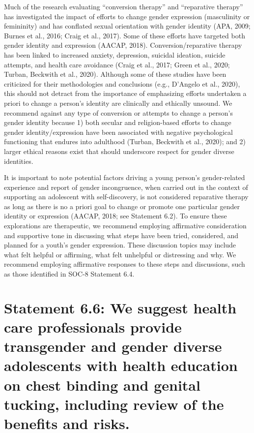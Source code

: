 \documentclass[
]{book}
\begin{document}
Much of the research evaluating ``conversion
therapy'' and ``reparative therapy'' has investigated
the impact of efforts to change gender expression
(masculinity or femininity) and has conflated
sexual orientation with gender identity (APA,
2009; Burnes et al., 2016; Craig et al., 2017).
Some of these efforts have targeted both gender
identity and expression (AACAP, 2018).
Conversion/reparative therapy has been linked to
increased anxiety, depression, suicidal ideation,
suicide attempts, and health care avoidance (Craig
et al., 2017; Green et al., 2020; Turban, Beckwith
et al., 2020). Although some of these studies have
been criticized for their methodologies and conclusions (e.g., D'Angelo et al., 2020), this should
not detract from the importance of emphasizing
efforts undertaken a priori to change a person's
identity are clinically and ethically unsound. We
recommend against any type of conversion or
attempts to change a person's gender identity
because 1) both secular and religion-based efforts
to change gender identity/expression have been
associated with negative psychological functioning
that endures into adulthood (Turban, Beckwith
et al., 2020); and 2) larger ethical reasons exist
that should underscore respect for gender diverse
identities.

It is important to note potential factors driving
a young person's gender-related experience and
report of gender incongruence, when carried out
in the context of supporting an adolescent with
self-discovery, is not considered reparative therapy as long as there is no a priori goal to change
or promote one particular gender identity or
expression (AACAP, 2018; see Statement 6.2). To
ensure these explorations are therapeutic, we recommend employing affirmative consideration and
supportive tone in discussing what steps have
been tried, considered, and planned for a youth's
gender expression. These discussion topics may
include what felt helpful or affirming, what felt
unhelpful or distressing and why. We recommend
employing affirmative responses to these steps
and discussions, such as those identified in
SOC-8 Statement 6.4.

\hypertarget{statement-6.6-we-suggest-health-care-professionals-provide-transgender-and-gender-diverse-adolescents-with-health-education-on-chest-binding-and-genital-tucking-including-review-of-the-benefits-and-risks.}{%
\section*{Statement 6.6: We suggest health care professionals provide transgender and gender diverse adolescents with health education on chest binding and genital tucking, including review of the benefits and risks.}\label{statement-6.6-we-suggest-health-care-professionals-provide-transgender-and-gender-diverse-adolescents-with-health-education-on-chest-binding-and-genital-tucking-including-review-of-the-benefits-and-risks.}}
\end{document}
